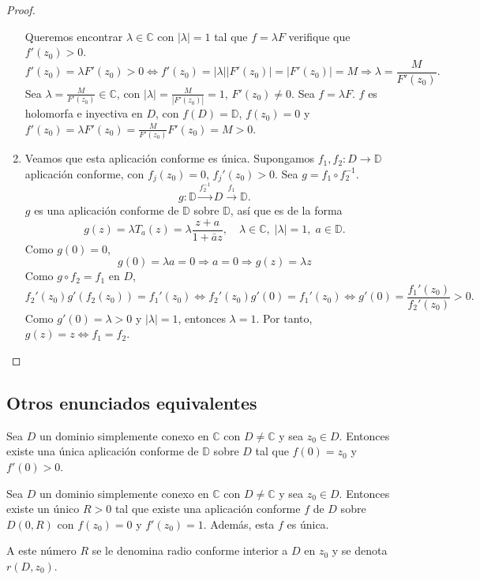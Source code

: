 \begin{proof}
\begin{enumerate}
              Queremos encontrar $\lambda \in \mathbb{C}$ con $|\lambda| = 1$ tal que $f = \lambda F$ verifique que $f'(z_0) > 0$.
              $$f'(z_0) = \lambda F'(z_0) > 0 \Leftrightarrow f'(z_0) = |\lambda||F'(z_0)| = |F'(z_0)| = M \Rightarrow \lambda = \frac{M}{F'(z_0)}.$$
              Sea $\lambda = \frac{M}{F'(z_0)} \in \mathbb{C}$, con $|\lambda| = \frac{M}{|F'(z_0)|} = 1$, $F'(z_0) \neq 0$.
              Sea $f = \lambda F$.
              $f$ es holomorfa e inyectiva en $D$, con $f(D) = \mathbb{D}$, $f(z_0) = 0$ y $f'(z_0) = \lambda F'(z_0) = \frac{M}{F'(z_0)}F'(z_0) = M > 0$.

        \item Veamos que esta aplicación conforme es única.
              Supongamos $f_1, f_2: D \to \mathbb{D}$ aplicación conforme, con $f_j(z_0) = 0$, $f_j'(z_0) > 0$.
              Sea $g = f_1 \circ f_2^{-1}$.
              $$g: \mathbb{D} \xrightarrow{f_2^{-1}} D \xrightarrow{f_1} \mathbb{D}.$$
              $g$ es una aplicación conforme de $\mathbb{D}$ sobre $\mathbb{D}$, así que es de la forma
              $$g(z) = \lambda T_a(z) = \lambda \frac{z+a}{1+\bar{a}z}, \quad \lambda \in \mathbb{C}, \; |\lambda| = 1, \; a \in \mathbb{D}.$$
              Como $g(0) = 0$,
              $$g(0) = \lambda a = 0 \Rightarrow a = 0 \Rightarrow g(z) = \lambda z$$
              Como $g \circ f_2 = f_1$ en $D$,
              $$f_2'(z_0)g'(f_2(z_0)) = f_1'(z_0) \Leftrightarrow f_2'(z_0)g'(0) = f_1'(z_0) \Leftrightarrow g'(0) = \frac{f_1'(z_0)}{f_2'(z_0)} > 0.$$
              Como $g'(0) = \lambda > 0$ y $|\lambda| = 1$, entonces $\lambda = 1$.
              Por tanto, $g(z) = z \Leftrightarrow f_1 = f_2$.
    \end{enumerate}
\end{proof}

\subsection*{Otros enunciados equivalentes}
\begin{theorem}
    Sea $D$ un dominio simplemente conexo en $\mathbb{C}$ con $D \neq \mathbb{C}$ y sea $z_0 \in D$.
    Entonces existe una única aplicación conforme de $\mathbb{D}$ sobre $D$ tal que $f(0) = z_0$ y $f'(0) > 0$.
\end{theorem}


\begin{theorem}
    Sea $D$ un dominio simplemente conexo en $\mathbb{C}$ con $D \neq \mathbb{C}$ y sea $z_0 \in D$.
    Entonces existe un único $R > 0$ tal que existe una aplicación conforme $f$ de $D$ sobre $D(0, R)$ con $f(z_0) = 0$ y $f'(z_0) = 1$.
    Además, esta $f$ es única.

    A este número $R$ se le denomina radio conforme interior a $D$ en $z_0$ y se denota $r(D, z_0)$.
\end{theorem}

